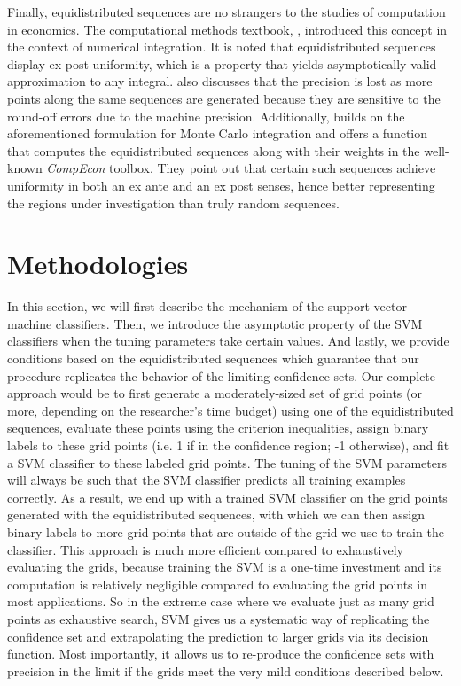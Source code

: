 \documentclass[12pt]{article}
\theoremstyle{definition}
\begin{document}
Finally, equidistributed sequences are no strangers to the studies of computation in economics. The computational methods textbook, \cite{Judd1998}, introduced this concept in the context of numerical integration. It is noted that equidistributed sequences display ex post uniformity, which is a property that yields asymptotically valid approximation to any integral. \cite{Judd1998} also discusses that the precision is lost as more points along the same sequences are generated because they are sensitive to the round-off errors due to the machine precision. Additionally, \cite{miranda_fackler} builds on the aforementioned formulation for Monte Carlo integration and offers a function that computes the equidistributed sequences along with their weights in the well-known \textit{CompEcon} toolbox. They point out that certain such sequences achieve uniformity in both an ex ante and an ex post senses, hence better representing the regions under investigation than truly random sequences. 




\section{Methodologies}\label{methods}
In this section, we will first describe the mechanism of the support vector machine classifiers. Then, we introduce the asymptotic property of the SVM classifiers when the tuning parameters take certain values. And lastly, we provide conditions based on the equidistributed sequences which guarantee that our procedure replicates the behavior of the limiting confidence sets. Our complete approach would be to first generate a moderately-sized set of grid points (or more, depending on the researcher's time budget) using one of the equidistributed sequences, evaluate these points using the criterion inequalities, assign binary labels to these grid points (i.e. 1 if in the confidence region; -1 otherwise), and fit a SVM classifier to these labeled grid points. The tuning of the SVM parameters will always be such that the SVM classifier predicts all training examples correctly. As a result, we end up with a trained SVM classifier on the grid points generated with the equidistributed sequences, with which we can then assign binary labels to more grid points that are outside of the grid we use to train the classifier. This approach is much more efficient compared to exhaustively evaluating the grids, because training the SVM is a one-time investment and its computation is relatively negligible compared to evaluating the grid points in most applications. So in the extreme case where we evaluate just as many grid points as exhaustive search, SVM gives us a systematic way of replicating the confidence set and extrapolating the prediction to larger grids via its decision function. Most importantly, it allows us to re-produce the confidence sets with precision in the limit if the grids meet the very mild conditions described below. 
\end{document}
